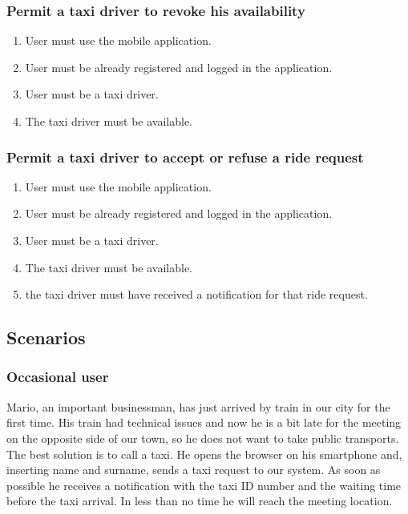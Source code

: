 		\subsubsection{Permit a taxi driver to revoke his availability}
			\begin{enumerate}[label=\bfseries R\arabic*:]
				\item User must use the mobile application.
				\item User must be already registered and logged in the application.
				\item User must be a taxi driver.
				\item The taxi driver must be available.
			\end{enumerate}
		\subsubsection{Permit a taxi driver to accept or refuse a ride request}
			\begin{enumerate}[label=\bfseries R\arabic*:]
				\item User must use the mobile application.
				\item User must be already registered and logged in the application.
				\item User must be a taxi driver.
				\item The taxi driver must be available.
				\item the taxi driver must have received a notification for that ride request.
			\end{enumerate}
	\subsection{Scenarios}
		\subsubsection{Occasional user}
			Mario, an important businessman, has just arrived by train in our city for the first time.
			His train had technical issues and now he is a bit late for the meeting on 
			the opposite side of our town, so he does not want to take public transports.
			The best solution is to call a taxi.
			He opens the browser on his smartphone and, inserting name and surname, sends a taxi request
			to our system. As soon as possible he receives a notification with the taxi ID number and the
			waiting time before the taxi arrival. In less than no time he will reach the meeting location.
